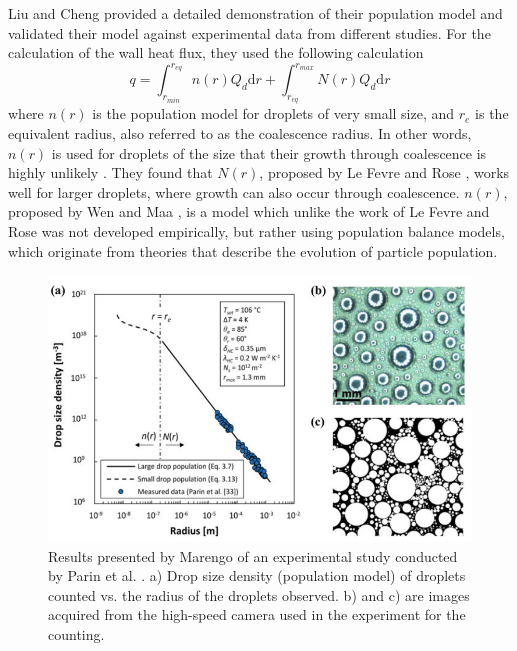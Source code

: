 \documentclass[12pt]{article}
\numberwithin{equation}{section}
\begin{document}
Liu and Cheng \cite{liu2015dropwise} provided a detailed demonstration of their population model and validated their model against experimental data from different studies. For the calculation of the wall heat flux, they used the following calculation
\begin{equation}
    q=\int_{r_{min}}^{r_{eq}}n(r)Q_{d}\mathrm{d}r+\int_{r_{eq}}^{r_{max}}N(r)Q_{d}\mathrm{d}r
\end{equation}
where $n(r)$ is the population model for droplets of very small size, and $r_{e}$ is the equivalent radius, also referred to as the coalescence radius. In other words, $n(r)$ is used for droplets of the size that their growth through coalescence is highly unlikely \cite{marengo2022surface}. They found that $N(r)$, proposed by Le Fevre and Rose \cite{rose1976further}, works well for larger droplets, where growth can also occur through coalescence. $n(r)$, proposed by Wen and Maa \cite{WEN1976225}, is a model which unlike the work of Le Fevre and Rose was not developed empirically, but rather using population balance models, which originate from theories that describe the evolution of particle population. 
\begin{figure}
    \centering
    \includegraphics[trim={0 0 0 0},clip,width=1\textwidth]{Figures/Parin_exp.png}
    \caption{Results presented by Marengo \cite{marengo2022surface} of an experimental study conducted by Parin et al. \cite{PARIN2020115718}. a) Drop size density (population model) of droplets counted vs. the radius of the droplets observed. b) and c) are images acquired from the high-speed camera used in the experiment for the counting.}
    \label{f:parin}
\end{figure}
\end{document}
